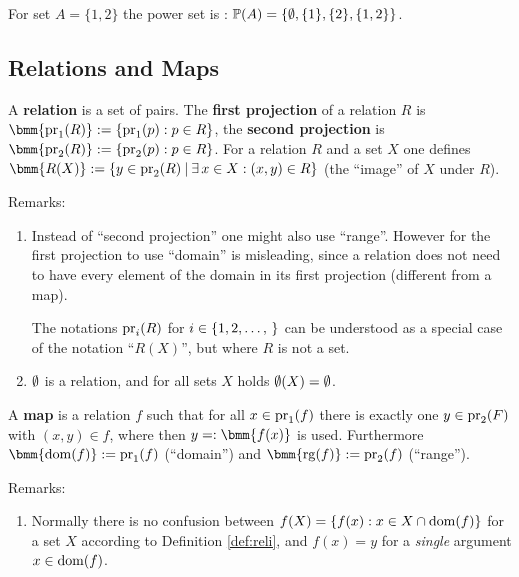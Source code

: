 \documentclass[12pt]{book}
\begin{document}
\begin{examp}\label{exp:infset}
 For set $A= \{1,2\}$ the power set is : $\operatorname{\mathbb{P}}(A)=\{ \emptyset,\{1\},\{2\},\{1,2\}\}$.
\end{examp}
\subsection{Relations and Maps}
\label{sec:maps}

\begin{defi}\label{def:reli}
  A \textbf{relation} is a set of pairs. The \textbf{first projection} of a relation $R$ is $\bmm{\proj_1(R)} := \set{\proj_1(p) : p \in R}$, the \textbf{second projection} is $\bmm{\proj_2(R)} := \set{\proj_2(p) : p \in R}$. For a relation $R$ and a set $X$ one defines $\bmm{R(X)}:= \set{y \in \proj_2(R) \mb \ex\, x \in X : (x,y) \in R}$ (the ``image'' of $X$ under $R$).
\end{defi}
Remarks:
\begin{enumerate}
\item Instead of ``second projection'' one might also use ``range''. However for the first projection to use ``domain'' is misleading, since a relation does not need to have every element of the domain in its first projection (different from a map).

  The notations $\operatorname{pr}_i(R)$ for $i \in \tb{1,2}$ can be understood as a special case of the notation ``$R(X)$'', but where $R$ is not a set.
\item $\emptyset$ is a relation, and for all sets $X$ holds $\emptyset(X) = \emptyset$.
\end{enumerate}

\begin{defi}\label{def:map}
  A \textbf{map} is a relation $f$ such that for all $x \in \operatorname{pr}_1(f)$ there is exactly one $y \in \operatorname{pr}_2(F)$ with $(x,y) \in f$, where then $y =: \bmm{f(x)}$ is used. Furthermore $\bmm{\dom(f)} := \proj_1(f)$ (``domain'') and $\bmm{\rg(f)} := \proj_2(f)$ (``range'').
\end{defi}
Remarks:
\begin{enumerate}
\item Normally there is no confusion between $f(X) = \{ f(x) : x \in X \cap \operatorname{dom}(f) \}$ for a set $X$ according to Definition \ref{def:reli}, and $f(x) = y$ for a \emph{single} argument $x \in \operatorname{dom}(f)$.
\end{enumerate}
\end{document}

